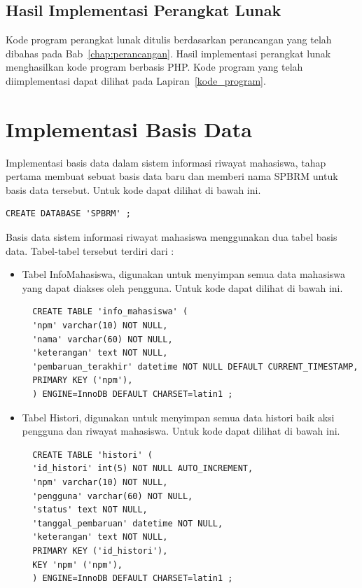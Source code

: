 \subsection{Hasil Implementasi Perangkat Lunak}
\label{sec:hasilimplementasi}

Kode program perangkat lunak ditulis berdasarkan perancangan yang telah dibahas pada Bab~\ref{chap:perancangan}. Hasil implementasi perangkat lunak menghasilkan kode program berbasis PHP. Kode program yang telah diimplementasi dapat dilihat pada Lapiran~\ref{kode_program}.

\section{Implementasi Basis Data}
\label{sec:implementasibasisdata}

Implementasi basis data dalam sistem informasi riwayat mahasiswa, tahap pertama membuat sebuat basis data baru dan memberi nama SPBRM untuk basis data tersebut. Untuk kode dapat dilihat di bawah ini.
\begin{lstlisting}
CREATE DATABASE 'SPBRM' ;
\end{lstlisting}

Basis data sistem informasi riwayat mahasiswa menggunakan dua tabel basis data. Tabel-tabel tersebut terdiri dari :
\begin{itemize}
\item Tabel InfoMahasiswa, digunakan untuk menyimpan semua data mahasiswa yang dapat diakses oleh pengguna. Untuk kode dapat dilihat di bawah ini.

\begin{lstlisting}
  CREATE TABLE 'info_mahasiswa' (
  'npm' varchar(10) NOT NULL,
  'nama' varchar(60) NOT NULL,
  'keterangan' text NOT NULL,
  'pembaruan_terakhir' datetime NOT NULL DEFAULT CURRENT_TIMESTAMP,
  PRIMARY KEY ('npm'),
  ) ENGINE=InnoDB DEFAULT CHARSET=latin1 ;
\end{lstlisting}

\item Tabel Histori, digunakan untuk menyimpan semua data histori baik aksi pengguna dan riwayat mahasiswa. Untuk kode dapat dilihat di bawah ini.
\begin{lstlisting}
  CREATE TABLE 'histori' (
  'id_histori' int(5) NOT NULL AUTO_INCREMENT,
  'npm' varchar(10) NOT NULL,
  'pengguna' varchar(60) NOT NULL,
  'status' text NOT NULL,
  'tanggal_pembaruan' datetime NOT NULL,
  'keterangan' text NOT NULL,
  PRIMARY KEY ('id_histori'),
  KEY 'npm' ('npm'),
  ) ENGINE=InnoDB DEFAULT CHARSET=latin1 ;
\end{lstlisting}
\end{itemize}

